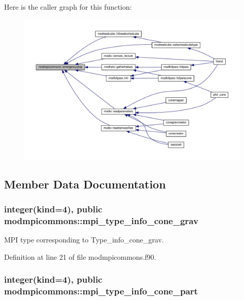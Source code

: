 Here is the caller graph for this function\-:\nopagebreak
\begin{figure}[H]
\begin{center}
\leavevmode
\includegraphics[width=350pt]{classmodmpicommons_a04e7d2c785e40fe089fef7c3b3cd5831_icgraph}
\end{center}
\end{figure}




\subsection{Member Data Documentation}
\hypertarget{classmodmpicommons_a3cc383a12a1eab12b23c3ab54ff01fbc}{
\subsubsection[{mpi\-\_\-type\-\_\-info\-\_\-cone\-\_\-grav}]{\setlength{\rightskip}{0pt plus 5cm}integer(kind=4), public modmpicommons\-::mpi\-\_\-type\-\_\-info\-\_\-cone\-\_\-grav}}\label{classmodmpicommons_a3cc383a12a1eab12b23c3ab54ff01fbc}


M\-P\-I type corresponding to Type\-\_\-info\-\_\-cone\-\_\-grav. 



Definition at line 21 of file modmpicommons.\-f90.

\hypertarget{classmodmpicommons_a9ab9e509165ff81f220a2a2a9e5057d9}{
\subsubsection[{mpi\-\_\-type\-\_\-info\-\_\-cone\-\_\-part}]{\setlength{\rightskip}{0pt plus 5cm}integer(kind=4), public modmpicommons\-::mpi\-\_\-type\-\_\-info\-\_\-cone\-\_\-part}}\label{classmodmpicommons_a9ab9e509165ff81f220a2a2a9e5057d9}


